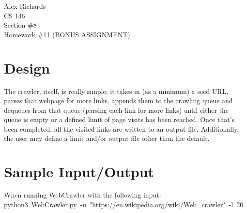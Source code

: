 \documentclass{article}
\begin{document}
\noindent Alex Richards\\
CS 146\\
Section \#8\\
Homework \#11 (BONUS ASSIGNMENT)\\

\section{Design}
The crawler, itself, is really simple; it takes in (as a minimum) a seed URL,
parses that webpage for more links, appends them to the crawling queue and
dequeues from that queue (parsing each link for more links) until either the
queue is empty or a defined limit of page visits has been reached. Once that's
been completed, all the visited links are written to an output file.
Additionally, the user may define a limit and/or output file other than the
default.\\

\section{Sample Input/Output}
When running WebCrawler with the following input:\\
\mbox{\hspace*{0.5cm}python3 WebCrawler.py -u "https://en.wikipedia.org/wiki/Web\_crawler" -l 20}\\
\end{document}
